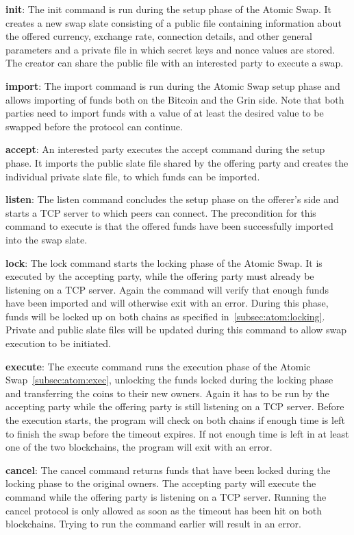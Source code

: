\begin{asparaitem}
    \item \textbf{init}: The init command is run during the setup phase of the Atomic Swap.
    It creates a new swap slate consisting of a public file containing information about the offered currency, exchange rate, connection details, and other general parameters and a private file in which secret keys and nonce values are stored.
    The creator can share the public file with an interested party to execute a swap.
    \item \textbf{import}: The import command is run during the Atomic Swap setup phase and allows importing of funds both on the Bitcoin and the Grin side.
    Note that both parties need to import funds with a value of at least the desired value to be swapped before the protocol can continue.
    \item \textbf{accept}: An interested party executes the accept command during the setup phase.
    It imports the public slate file shared by the offering party and creates the individual private slate file, to which funds can be imported.
    \item \textbf{listen}: The listen command concludes the setup phase on the offerer's side and starts a TCP server to which peers can connect.
    The precondition for this command to execute is that the offered funds have been successfully imported into the swap slate.
    \item \textbf{lock}: The lock command starts the locking phase of the Atomic Swap.
    It is executed by the accepting party, while the offering party must already be listening on a TCP server.
    Again the command will verify that enough funds have been imported and will otherwise exit with an error.
    During this phase, funds will be locked up on both chains as specified in~\cref{subsec:atom:locking}.
    Private and public slate files will be updated during this command to allow swap execution to be initiated.
    \item \textbf{execute}: The execute command runs the execution phase of the Atomic Swap~\cref{subsec:atom:exec}, unlocking the funds locked during the locking phase and transferring the coins to their new owners.
    Again it has to be run by the accepting party while the offering party is still listening on a TCP server.
    Before the execution starts, the program will check on both chains if enough time is left to finish the swap before the timeout expires.
    If not enough time is left in at least one of the two blockchains, the program will exit with an error.
    \item \textbf{cancel}: The cancel command returns funds that have been locked during the locking phase to the original owners.
    The accepting party will execute the command while the offering party is listening on a TCP server.
    Running the cancel protocol is only allowed as soon as the timeout has been hit on both blockchains.
    Trying to run the command earlier will result in an error.
\end{asparaitem}

